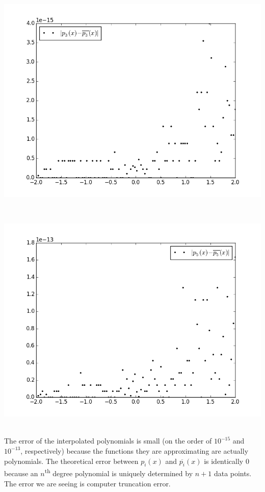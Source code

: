 \documentclass[12pt]{article}
\begin{document}
\begin{enumerate}[\ \ (a)\ \ ]
\centerline{\includegraphics[scale=0.65]{figures/problem3_a_error.png}}\\
\centerline{\includegraphics[scale=0.65]{figures/problem3_b_error.png}}\\
The error of the interpolated polynomials is small (on the order of $10^{-15}$ and $10^{-13}$, respectively) because the functions they are approximating are actually polynomials.  The theoretical error between $p_i(x)$ and $\overline{p_i}(x)$ is identically $0$ because an $n$\textsuperscript{th} degree polynomial is uniquely determined by $n+1$ data points.  The error we are seeing is computer truncation error.
\end{enumerate}
\end{document}
